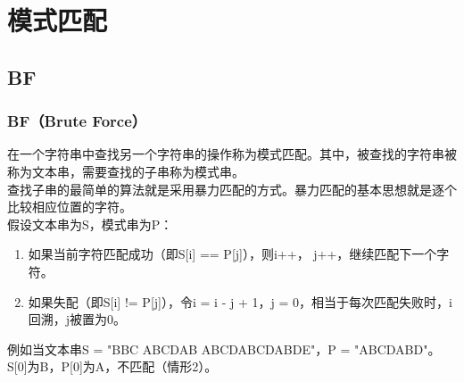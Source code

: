 \chapter{模式匹配}

\section{BF}

\subsection{BF（Brute Force）}

在一个字符串中查找另一个字符串的操作称为模式匹配。其中，被查找的字符串被称为文本串，需要查找的子串称为模式串。\\

查找子串的最简单的算法就是采用暴力匹配的方式。暴力匹配的基本思想就是逐个比较相应位置的字符。\\

假设文本串为S，模式串为P：

\begin{enumerate}
	\item 如果当前字符匹配成功（即S[i] == P[j]），则i++， j++，继续匹配下一个字符。

	\item 如果失配（即S[i] != P[j]），令i = i - j + 1，j = 0，相当于每次匹配失败时，i回溯，j被置为0。
\end{enumerate}

例如当文本串S = "BBC ABCDAB ABCDABCDABDE"，P = "ABCDABD"。\\

S[0]为B，P[0]为A，不匹配（情形2）。

\begin{table}[H]
	\centering
\end{table}

